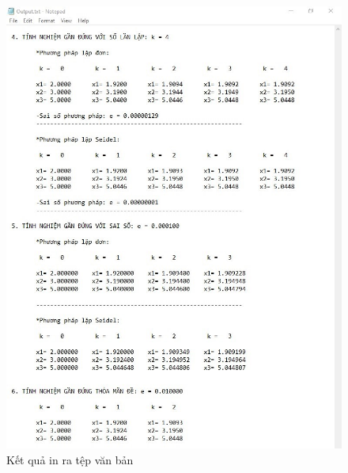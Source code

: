 \documentclass[twoside]{report2}
\begin{document}
\begin{figure}[!h]
\label{fig:33}
\centering
\includegraphics[scale=0.6]{figures/fig2}
\caption{Kết quả in ra tệp văn bản}
\end{figure}
\end{document}
